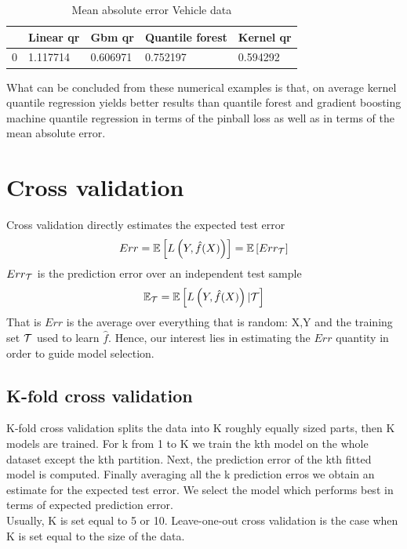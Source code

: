 \begin{table}
    \caption{Mean absolute error Vehicle data}
    \begin{tabular}{lllll}
    \toprule
     & Linear qr & Gbm qr & Quantile forest & Kernel qr \\
    \midrule
    0 & 1.117714 & 0.606971 & 0.752197 & 0.594292 \\
    \bottomrule
    \end{tabular}
\end{table}
What can be concluded from these numerical examples is that, on average kernel quantile regression yields better results than quantile forest \cite{meinshausen2006quantile} and gradient boosting machine quantile regression \cite {friedman2001greedy} in terms of the pinball loss as well as in terms of the mean absolute error.



\section{Cross validation}\label{appendix:cross_validation}
Cross validation directly estimates the expected test error
\begin{equation}
    Err=\mathbb{E}\left[L\left(Y,\hat{f}(X)\right)\right]=\mathbb{E}\left[Err_{\mathcal{T}}\right]
\end{equation}
$Err_{\mathcal{T}}$ is the prediction error over an independent test sample
\begin{equation}
    \mathbb{E}_{\mathcal{T}}=\mathbb{E}\left[L\left(Y,\hat{f}(X)\right)| \mathcal{T} \right]
\end{equation}
That is $Err$ is the average over everything that is random: X,Y and the training set $\mathcal{T}$ used to learn $\hat{f}$. Hence, our interest lies in estimating the $Err$ quantity in order to guide model selection.
\subsection{K-fold cross validation}
K-fold cross validation splits the data into K roughly equally sized parts, then K models are trained. For k from 1 to K we train the kth model on the whole dataset except the kth partition. Next,  the prediction error of the kth fitted model is computed. Finally averaging all the k prediction erros we obtain an estimate for the expected test error. We select the model which performs best in terms of expected prediction error.
\\
Usually, K is set equal to 5 or 10. Leave-one-out cross validation is the case when K is set equal to the size of the data.

